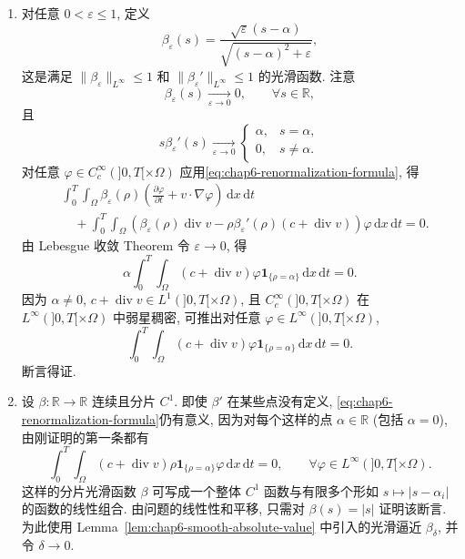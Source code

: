 \begin{sloppypar}
\begin{Proof}
\begin{enumerate}
 \item 对任意 $0<\varepsilon\leq1$, 定义
 \[
  \beta_\varepsilon(s)=\frac{\sqrt\varepsilon(s-\alpha)}{\sqrt{(s-\alpha)^2+\varepsilon}},
 \]
 这是满足 $\|\beta_\varepsilon\|_{L^\infty}\leq1$ 和 $\|\beta_\varepsilon'\|_{L^\infty}\leq1$ 的光滑函数. 注意
 \[
  \beta_\varepsilon(s)\xrightarrow[\varepsilon\to0]{}0,
  \qquad\forall s\in\mathbb R,
 \]
 且
 \[
  s\beta_\varepsilon'(s)\xrightarrow[\varepsilon\to0]{}
  \begin{cases}
   \alpha,&s=\alpha,\\
   0,&s\neq\alpha.
  \end{cases}
 \]
 对任意 $\varphi\in C_c^\infty(]0,T[\times\Omega)$ 应用\eqref{eq:chap6-renormalization-formula}, 得
 \[
 \begin{aligned}
 &\int_0^T\int_\Omega\beta_\varepsilon(\rho)
 \left(\frac{\partial\varphi}{\partial t}+v\cdot\nabla\varphi\right)
 \,\mathrm dx\,\mathrm dt\\
 &\quad+\int_0^T\int_\Omega
 \left(\beta_\varepsilon(\rho)\operatorname{div}v
 -\rho\beta_\varepsilon'(\rho)(c+\operatorname{div}v)\right)
 \varphi\,\mathrm dx\,\mathrm dt=0.
 \end{aligned}
 \]
 由 Lebesgue 收敛 Theorem 令 $\varepsilon\to0$, 得
 \[
  \alpha\int_0^T\int_\Omega(c+\operatorname{div}v)
  \varphi\mathbf1_{\{\rho=\alpha\}}\,\mathrm dx\,\mathrm dt=0.
 \]
 因为 $\alpha\neq0$, $c+\operatorname{div}v\in L^1(]0,T[\times\Omega)$, 且 $C_c^\infty(]0,T[\times\Omega)$ 在 $L^\infty(]0,T[\times\Omega)$ 中弱星稠密, 可推出对任意 $\varphi\in L^\infty(]0,T[\times\Omega)$,
 \[
  \int_0^T\int_\Omega(c+\operatorname{div}v)
  \varphi\mathbf1_{\{\rho=\alpha\}}\,\mathrm dx\,\mathrm dt=0.
 \]
 断言得证.

 \item 设 $\beta:\mathbb R\to\mathbb R$ 连续且分片 $C^1$. 即使 $\beta'$ 在某些点没有定义, \eqref{eq:chap6-renormalization-formula}仍有意义, 因为对每个这样的点 $\alpha\in\mathbb R$ (包括 $\alpha=0$), 由刚证明的第一条都有
 \[
  \int_0^T\int_\Omega(c+\operatorname{div}v)\rho
  \mathbf1_{\{\rho=\alpha\}}\varphi\,\mathrm dx\,\mathrm dt=0,
  \qquad\forall\varphi\in L^\infty(]0,T[\times\Omega).
 \]
 这样的分片光滑函数 $\beta$ 可写成一个整体 $C^1$ 函数与有限多个形如 $s\mapsto|s-\alpha_i|$ 的函数的线性组合. 由问题的线性性和平移, 只需对 $\beta(s)=|s|$ 证明该断言. 为此使用 Lemma~\ref{lem:chap6-smooth-absolute-value} 中引入的光滑逼近 $\beta_\delta$, 并令 $\delta\to0$.
\end{enumerate}
\end{Proof}


\end{sloppypar}
